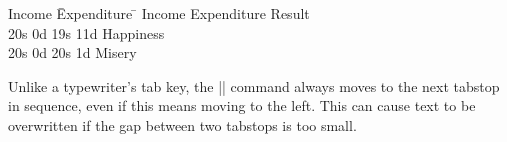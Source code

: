 \smallskip

\begin{tabbing}
Income \=Expenditure \=    \kill
Income \>Expenditure \>Result \\
20s 0d \>19s 11d \>Happiness   \\
20s 0d \>20s 1d  \>Misery    \\
\end{tabbing}


Unlike a typewriter's tab key, the |\>| command always moves to the next
tabstop in sequence, even if this means moving to the left.  This can cause
text to be overwritten if the gap between two tabstops is too small.


\begin{comment}
\section{Environment}

\begin{teX}
\def\beginstory{
  \vskip 0.5in                 %
   \begingroup                  %
   \leftskip 1in\rightskip 1in  %
   \itshape                     %
   \noindent{.\dotfill{}.\par}  %
}

\def\endstory{
  \par\noindent{.\dotfill{}.\par}  %
  \endgroup                        %
  \vskip 0.5in                    %
}

\beginstory 

  Just a short story 

\endstory

\end{teX}



Here's a story about the formative era of personal computing. I
originally wrote it in 1999, but the point it makes is still valid.
Hope you like it.



\subsection*{The \protect\latex way}
LaTeX implements macros |\begin| and |\end|. These are a generic pair whose argument determines the environment that's being begun or ended.


\end{comment}
